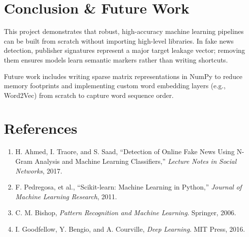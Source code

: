 \documentclass[conference]{IEEEtran}
\begin{document}
\section{Conclusion \& Future Work}
This project demonstrates that robust, high-accuracy machine learning pipelines can be built from scratch without importing high-level libraries. In fake news detection, publisher signatures represent a major target leakage vector; removing them ensures models learn semantic markers rather than writing shortcuts.

Future work includes writing sparse matrix representations in NumPy to reduce memory footprints and implementing custom word embedding layers (e.g., Word2Vec) from scratch to capture word sequence order.

\section*{References}
\begin{small}
\begin{enumerate}
\item H. Ahmed, I. Traore, and S. Saad, ``Detection of Online Fake News Using N-Gram Analysis and Machine Learning Classifiers,'' \textit{Lecture Notes in Social Networks}, 2017.
\item F. Pedregosa, et al., ``Scikit-learn: Machine Learning in Python,'' \textit{Journal of Machine Learning Research}, 2011.
\item C. M. Bishop, \textit{Pattern Recognition and Machine Learning}. Springer, 2006.
\item I. Goodfellow, Y. Bengio, and A. Courville, \textit{Deep Learning}. MIT Press, 2016.
\end{enumerate}
\end{small}
\end{document}
